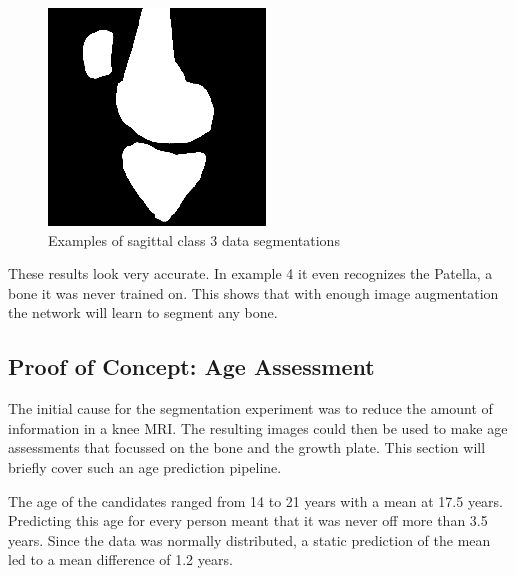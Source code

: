 \begin{figure}[H]
\endminipage\hfill
{}%
  \includegraphics[width=\linewidth]{imgs/transfer_pers_y4.png}
\endminipage
\caption{Examples of sagittal class 3 data segmentations}
\end{figure}

These results look very accurate. In example 4 it even recognizes the Patella, a bone it was never trained on. This shows that with enough image augmentation the network will learn to segment any bone.

\subsection{Proof of Concept: Age Assessment}

The initial cause for the segmentation experiment was to reduce the amount of information in a knee MRI. The resulting images could then be used to make age assessments that focussed on the bone and the growth plate. This section will briefly cover such an age prediction pipeline.

The age of the candidates ranged from 14 to 21 years with a mean at 17.5 years. Predicting this age for every person meant that it was never off more than 3.5 years. Since the data was normally distributed, a static prediction of the mean led to a mean difference of 1.2 years.

